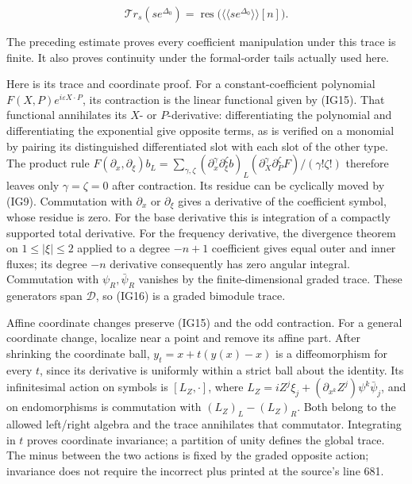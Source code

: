 \documentclass[
  11pt,
]{article}
\begin{document}
\[
 \mathcal{T}r_s(se^{\Delta_0})=
      \operatorname{res}\big(
            \langle\!\langle se^{\Delta_0}\rangle\!\rangle[n]\big).
\tag{IG16}
\]

The preceding estimate proves every coefficient manipulation under this
trace is finite. It also proves continuity under the formal-order tails
actually used here.

Here is its trace and coordinate proof. For a constant-coefficient
polynomial \(F(X,P)e^{i\varepsilon X\cdot P}\), its contraction is the
linear functional given by (IG15). That functional annihilates its
\(X\)- or \(P\)-derivative: differentiating the polynomial and
differentiating the exponential give opposite terms, as is verified on a
monomial by pairing its distinguished differentiated slot with each slot
of the other type. The product rule
\(F(\partial_x,\partial_\xi)b_L=\sum_{\gamma,\zeta}(\partial_x^\gamma\partial_\xi^\zeta b)_L(\partial_X^\gamma\partial_P^\zeta F)/(\gamma!\zeta!)\)
therefore leaves only \(\gamma=\zeta=0\) after contraction. Its residue
can be cyclically moved by (IG9). Commutation with \(\partial_x\) or
\(\partial_\xi\) gives a derivative of the coefficient symbol, whose
residue is zero. For the base derivative this is integration of a
compactly supported total derivative. For the frequency derivative, the
divergence theorem on \(1\leq|\xi|\leq2\) applied to a degree \(-n+1\)
coefficient gives equal outer and inner fluxes; its degree \(-n\)
derivative consequently has zero angular integral. Commutation with
\(\psi_R,\bar\psi_R\) vanishes by the finite-dimensional graded trace.
These generators span \(\mathcal D\), so (IG16) is a graded bimodule
trace.

Affine coordinate changes preserve (IG15) and the odd contraction. For a
general coordinate change, localize near a point and remove its affine
part. After shrinking the coordinate ball, \(y_t=x+t(y(x)-x)\) is a
diffeomorphism for every \(t\), since its derivative is uniformly within
a strict ball about the identity. Its infinitesimal action on symbols is
\([L_Z,\cdot]\), where
\(L_Z=iZ^j\xi_j+(\partial_{x^k}Z^j)\psi^k\bar\psi_j\), and on
endomorphisms is commutation with \((L_Z)_L-(L_Z)_R\). Both belong to
the allowed left/right algebra and the trace annihilates that
commutator. Integrating in \(t\) proves coordinate invariance; a
partition of unity defines the global trace. The minus between the two
actions is fixed by the graded opposite action; invariance does not
require the incorrect plus printed at the source's line 681.
\end{document}
